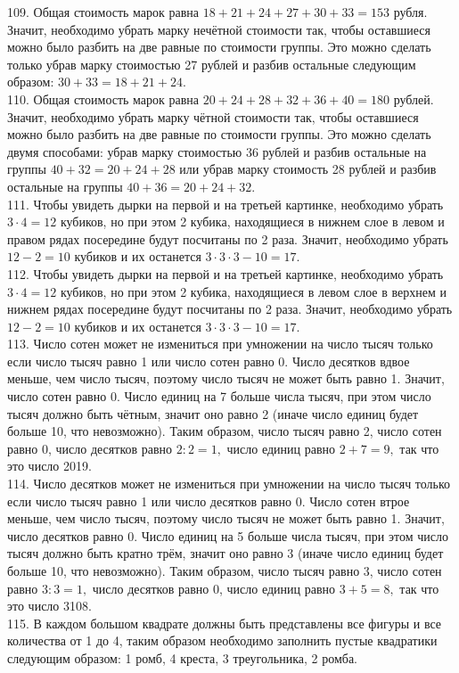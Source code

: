 109. Общая стоимость марок равна $18+21+24+27+30+33=153$ рубля. Значит, необходимо убрать марку нечётной стоимости так, чтобы оставшиеся можно было разбить на две равные по стоимости группы. Это можно сделать только убрав марку стоимостью 27 рублей и разбив остальные следующим образом: $30+33=18+21+24.$\\
110. Общая стоимость марок равна $20+24+28+32+36+40=180$ рублей. Значит, необходимо убрать марку чётной стоимости так, чтобы оставшиеся можно было разбить на две равные по стоимости группы. Это можно сделать двумя способами: убрав марку стоимостью 36 рублей и разбив остальные на группы $40+32=20+24+28$ или убрав марку стоимость 28 рублей и разбив остальные на группы $40+36=20+24+32.$\\
111. Чтобы увидеть дырки на первой и на третьей картинке, необходимо убрать $3\cdot4=12$ кубиков, но при этом 2 кубика, находящиеся в нижнем слое в левом и правом рядах посередине будут посчитаны по 2 раза. Значит, необходимо убрать $12-2=10$ кубиков и их останется $3\cdot3\cdot3-10=17.$\\
112. Чтобы увидеть дырки на первой и на третьей картинке, необходимо убрать $3\cdot4=12$ кубиков, но при этом 2 кубика, находящиеся в левом слое в верхнем и нижнем рядах посередине будут посчитаны по 2 раза. Значит, необходимо убрать $12-2=10$ кубиков и их останется $3\cdot3\cdot3-10=17.$\\
113. Число сотен может не измениться при умножении на число тысяч только если число тысяч равно 1 или число сотен равно 0. Число десятков вдвое меньше, чем число тысяч, поэтому число тысяч не может быть равно 1. Значит, число сотен равно 0. Число единиц на 7 больше числа тысяч, при этом число тысяч должно быть чётным, значит оно равно 2 (иначе число единиц будет больше 10, что невозможно). Таким образом, число тысяч равно 2, число сотен равно 0, число десятков равно $2:2=1,$ число единиц равно $2+7=9,$ так что это число 2019.\\
114. Число десятков может не измениться при умножении на число тысяч только если число тысяч равно 1 или число десятков равно 0. Число сотен втрое меньше, чем число тысяч, поэтому число тысяч не может быть равно 1. Значит, число десятков равно 0. Число единиц на 5 больше числа тысяч, при этом число тысяч должно быть кратно трём, значит оно равно 3 (иначе число единиц будет больше 10, что невозможно). Таким образом, число тысяч равно 3, число сотен равно $3:3=1,$ число десятков равно 0, число единиц равно $3+5=8,$ так что это число 3108.\\
115. В каждом большом квадрате должны быть представлены все фигуры и все количества от 1 до 4, таким образом необходимо заполнить пустые квадратики следующим образом: 1 ромб, 4 креста, 3 треугольника, 2 ромба.\\
